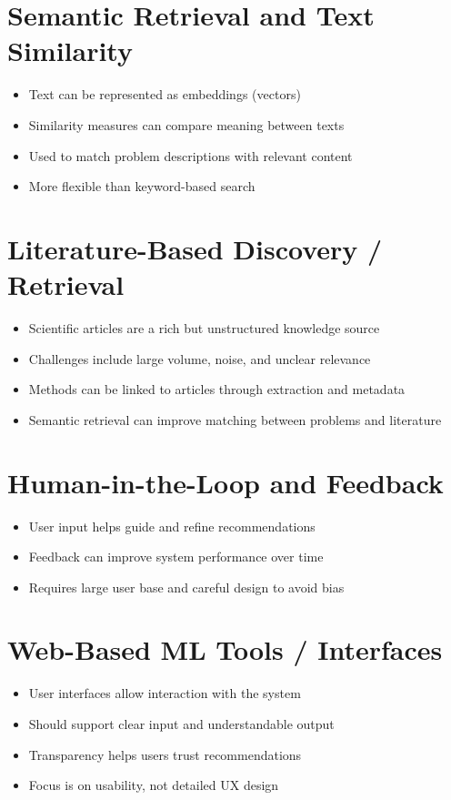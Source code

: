 \section{Semantic Retrieval and Text Similarity}
\begin{itemize}
    \item Text can be represented as embeddings (vectors)
    \item Similarity measures can compare meaning between texts
    \item Used to match problem descriptions with relevant content
    \item More flexible than keyword-based search
\end{itemize}

\section{Literature-Based Discovery / Retrieval}
\begin{itemize}
    \item Scientific articles are a rich but unstructured knowledge source
    \item Challenges include large volume, noise, and unclear relevance
    \item Methods can be linked to articles through extraction and metadata
    \item Semantic retrieval can improve matching between problems and literature
\end{itemize}

\section{Human-in-the-Loop and Feedback}
\begin{itemize}
    \item User input helps guide and refine recommendations
    \item Feedback can improve system performance over time
    \item Requires large user base and careful design to avoid bias
\end{itemize}

\section{Web-Based ML Tools / Interfaces}
\begin{itemize}
    \item User interfaces allow interaction with the system
    \item Should support clear input and understandable output
    \item Transparency helps users trust recommendations
    \item Focus is on usability, not detailed UX design
\end{itemize}


